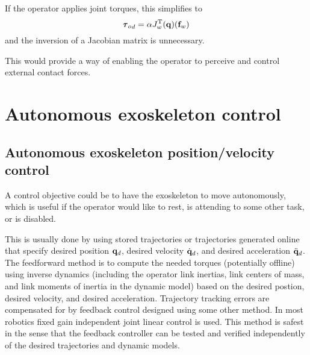 \documentclass[letterpaper,12pt,fullpage]{article}
\begin{document}
If the operator applies joint torques, this simplifies to
\begin{equation}
{\vtau_o}_d = \alpha J_w^{\tr}(\vq) ( \vf_w )
\end{equation}
and the inversion of a Jacobian matrix is unnecessary.

This would provide a way of enabling the operator to perceive and control
external contact forces.

\section{Autonomous exoskeleton control}

\subsection{Autonomous exoskeleton position/velocity control}

A control objective could be to have the exoskeleton to move autonomously,
which is useful if the operator would like to rest, is attending to some other
task, or is disabled.

This is usually done by using stored trajectories or trajectories generated
online that specify desired position ${\bf q}_d$, 
desired velocity $\dot{{\bf q}}_d$, and
desired acceleration $\ddot{{\bf q}}_d$.
The feedforward method is to compute the needed torques (potentially offline)
using inverse
dynamics (including the operator link inertias, link centers of mass, and link
moments of inertia in the dynamic model) based on the desired postion, 
desired velocity, and desired acceleration. Trajectory tracking errors are compensated
for by feedback control designed using some other method. In most robotics
fixed gain independent joint linear control is used.
This method is safest in the sense that the feedback controller can be tested
and verified independently of the desired trajectories and dynamic models.
\end{document}
